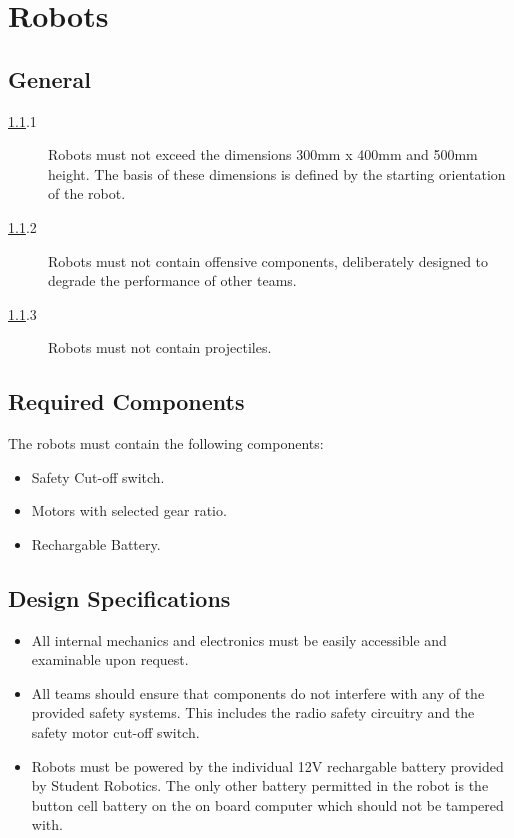 \section {Robots}
\label{robots}

\subsection {General}
\label{genrob}

\begin {description}
\item [\ref{genrob}.1] Robots must not exceed the dimensions 300mm x 400mm and 500mm height. The basis of these dimensions is defined by the starting orientation of the robot.
\item [\ref{genrob}.2] Robots must not contain offensive components, deliberately designed to degrade the performance of other teams.
\item [\ref{genrob}.3] Robots must not contain projectiles.
\end {description}


\subsection {Required Components}

The robots must contain the following components:

\begin {itemize}
\item {Safety Cut-off switch.}
\item {Motors with selected gear ratio.}
\item {Rechargable Battery.}
\end {itemize}

\subsection {Design Specifications}
\label {design}

\begin {itemize}
\item [\ref{design}.1] All internal mechanics and electronics must be easily accessible and examinable upon request.
\item [\ref{design}.2] All teams should ensure that components do not interfere with any of the provided safety systems. This includes the radio safety circuitry and the safety motor cut-off switch.
\item [\ref{design}.3] Robots must be powered by the individual 12V rechargable battery provided by Student Robotics. The only other battery permitted in the robot is the button cell battery on the on board computer which should not be tampered with.
\end {itemize}
